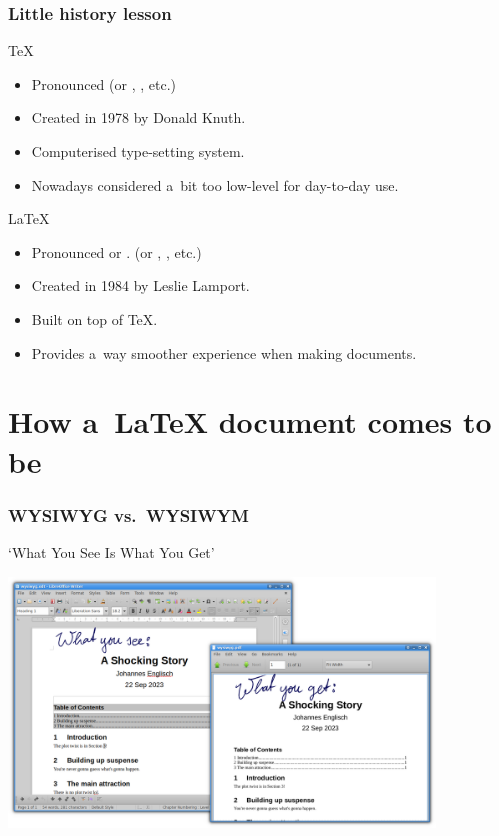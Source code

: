 \documentclass[a4paper,12pt]{beamer}
\begin{document}
\begin{frame}
  \frametitle{Little history lesson}

  \begin{block}{\TeX}
    \begin{itemize}
      \item Pronounced \textipa{[tEk]}
        {\footnotesize{}(or \textipa{[tEx]}, \textipa{[tE\c{c}]}, etc.)}
      \item Created in 1978 by Donald Knuth.
      \item Computerised type-setting system.
      \item Nowadays considered a~bit too low-level for day-to-day use.
    \end{itemize}
  \end{block}

  \pause{}

  \begin{block}{\LaTeX}
    \begin{itemize}
      \item Pronounced \textipa{[lA:tEk]} or \textipa{[leItEk]}.
        {\footnotesize{}(or \textipa{[-tEx]}, \textipa{[-tE\c{c}]}, etc.)}
      \item Created in 1984 by Leslie Lamport.
      \item Built on top of \TeX.
      \item Provides a~way smoother experience when making documents.
    \end{itemize}
  \end{block}
\end{frame}

\section{How a~\LaTeX{} document comes to be}

\begin{frame}
  \frametitle{WYSIWYG vs.\ WYSIWYM}

  \begin{block}{`What You See Is What You Get'}
    \begin{center}
      \includegraphics[width=0.85\textwidth]{images/wysiwyg.png}
    \end{center}
  \end{block}
\end{frame}
\end{document}
